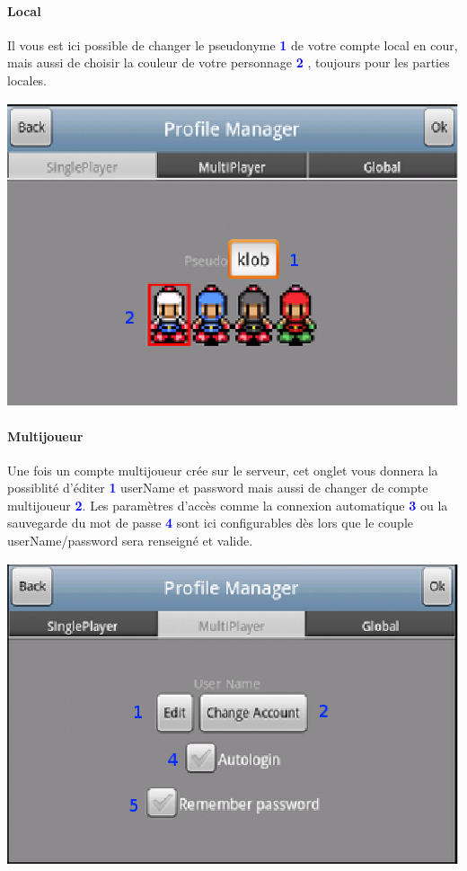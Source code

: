 		\paragraph{Local\\}
		Il vous est ici possible de changer le pseudonyme \textcolor{blue}{\textbf{1}}
		de votre compte local en cour, mais aussi de choisir la couleur de votre
		personnage \textcolor{blue}{\textbf{2}} , toujours pour les parties locales.
		\begin{center}
				\includegraphics[scale=0.7]{Manuel/Img/5.eps}
			\end{center}
		
		\paragraph{Multijoueur\\}
		Une fois un compte multijoueur crée sur le serveur, cet onglet vous donnera la
		possiblité d'éditer \textcolor{blue}{\textbf{1}} userName et password mais
		aussi de changer de compte multijoueur \textcolor{blue}{\textbf{2}}. Les
		paramètres d'accès comme la connexion automatique
		\textcolor{blue}{\textbf{3}} ou la sauvegarde du mot de passe
		\textcolor{blue}{\textbf{4}} sont ici configurables dès lors que le couple
		userName/password sera renseigné et valide.
		
		\begin{center}
				\includegraphics[scale=0.7]{Manuel/Img/6.eps}
		\end{center}
		
